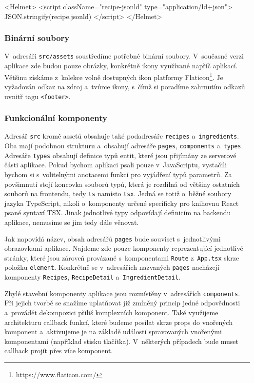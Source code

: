 \begingroup
\samepage
\begin{code}
<Helmet>
  <script className="recipe-jsonld" type="application/ld+json">
    {JSON.stringify(recipe.jsonld)}
  </script>
</Helmet>
\end{code}
\endgroup

\subsubsection{Binární soubory}

V~adresáři \texttt{src/assets} soustředíme potřebné binární soubory. V~současné verzi aplikace zde budou pouze obrázky, konkrétně ikony využívané napříč aplikací. Většinu získáme z~kolekce volně dostupných ikon platformy Flaticon\footnote{https://www.flaticon.com/}. Je vyžadován odkaz na zdroj a~tvůrce ikony, s~čímž si poradíme zahrnutím odkazů uvnitř tagu \texttt{<footer>}.

\subsubsection{Funkcionální komponenty}

Adresář \texttt{src} kromě assetů obsahuje také podadresáře \texttt{recipes} a~\texttt{ingredients}. Oba mají podobnou strukturu a~obsahují adresáře \texttt{pages}, \texttt{components} a~\texttt{types}. Adresáře \texttt{types} obsahují definice typů entit, které jsou přijímány ze serverové části aplikace. Pokud bychom aplikaci psali pouze v~JavaScriptu, vystačili bychom si s~volitelnými anotacemi funkcí pro vyjádření typů parametrů. Za povšimnutí stojí koncovka souborů typů, která je rozdílná od většiny ostatních souborů na frontendu, tedy \texttt{ts} namísto \texttt{tsx}. Jedná se totiž o~běžné soubory jazyka TypeScript, nikoli o~komponenty určené specificky pro knihovnu React psané syntaxí TSX. Jinak jednotlivé typy odpovídají definicím na backendu aplikace, nemusíme se jim tedy dále věnovat.

Jak napovídá název, obsah adresářů \texttt{pages} bude souviset s~jednotlivými obrazovkami aplikace. Najdeme zde pouze komponenty reprezentující jednotlivé stránky, které jsou zároveň provázané s~komponentami \texttt{Route} z~\texttt{App.tsx} skrze položku \texttt{element}. Konkrétně se v~adresářích nazvaných \texttt{pages} nacházejí komponenty \texttt{Recipes}, \texttt{RecipeDetail} a~\texttt{IngredientDetail}.

Zbylé stavební komponenty aplikace jsou rozmístěny v~adresářích \texttt{components}. Při jejich tvorbě se snažíme uplatňovat již zmíněný princip jedné odpovědnosti a~provádět dekompozici příliš komplexních komponent. Také využijeme architekturu callback funkcí, které budeme posílat skrze props do vnořených komponent a~aktivujeme je na základě událostí spravovaných vnořenými komponentami (například stisku tlačítka). V~některých případech bude muset callback projít přes více komponent.

